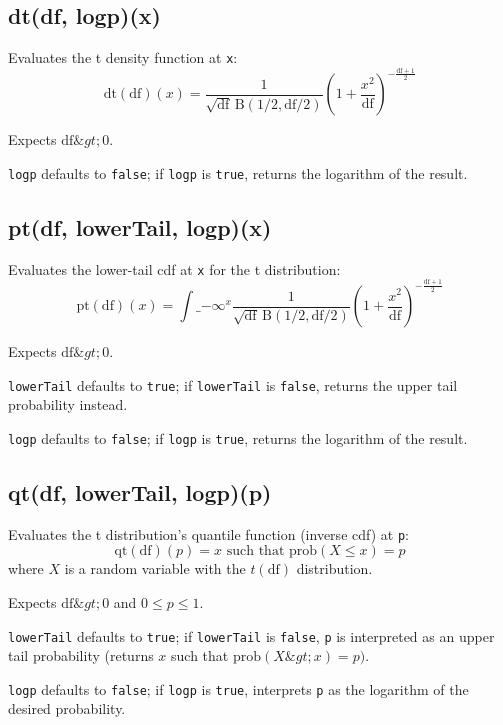 \documentclass{article}
\begin{document}
    \subsection*{dt(df, logp)(x)}
    Evaluates the t density function at \texttt{x}:
$$\textrm{dt}(\textrm{df})(x) = \frac{1}{\sqrt{\textrm{df}}\,\textrm{B}(1/2, \textrm{df}/2)} \left(1+\frac{x^2}{\textrm{df}} \right)^{-\frac{\textrm{df} + 1}{2}}$$


Expects $\textrm{df} \&gt; 0$.


\texttt{logp} defaults to \texttt{false}; if \texttt{logp} is \texttt{true}, returns the
logarithm of the result.


    \subsection*{pt(df, lowerTail, logp)(x)}
    Evaluates the lower-tail cdf at \texttt{x} for the t distribution:
$$\textrm{pt}(\textrm{df})(x) = \int\_{-\infty}^{x} \frac{1}{\sqrt{\textrm{df}}\,\textrm{B}(1/2, \textrm{df}/2)} \left(1+\frac{x^2}{\textrm{df}} \right)^{-\frac{\textrm{df} + 1}{2}}$$


Expects $\textrm{df} \&gt; 0$.


\texttt{lowerTail} defaults to \texttt{true}; if \texttt{lowerTail} is \texttt{false}, returns
the upper tail probability instead.


\texttt{logp} defaults to \texttt{false}; if \texttt{logp} is \texttt{true}, returns the logarithm
of the result.


    \subsection*{qt(df, lowerTail, logp)(p)}
    Evaluates the t distribution's quantile function
(inverse cdf) at \texttt{p}:
$$\textrm{qt}(\textrm{df})(p) = x \textrm{ such that } \textrm{prob}(X \leq x) = p$$
where $X$ is a random variable with the $t(\textrm{df})$ distribution.


Expects $\textrm{df} \&gt; 0$ and $0 \leq p \leq 1$.


\texttt{lowerTail} defaults to \texttt{true}; if \texttt{lowerTail} is \texttt{false}, \texttt{p} is
interpreted as an upper tail probability (returns
$x$ such that $\textrm{prob}(X \&gt; x) = p)$.


\texttt{logp} defaults to \texttt{false}; if \texttt{logp} is \texttt{true}, interprets \texttt{p} as
the logarithm of the desired probability.
\end{document}
